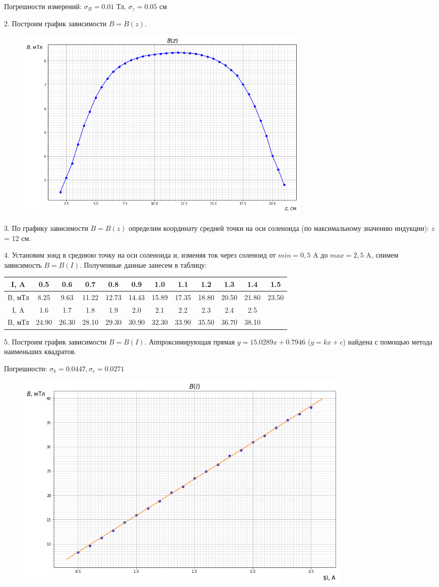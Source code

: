 \documentclass[a4paper]{article}
\begin{document}
Погрешности измерений: $\sigma_{B} = 0.01$ Тл, $\sigma_{z} = 0.05$ см


	2. Построим график зависимости  $B = B(z)$.
\begin{figure}[H]
\centering
\includegraphics[width=0.7\textwidth]{1_2_ris1.png}
\end{figure}

	3. По графику зависимости $B =B(z)$ определим координату средней точки на оси соленоида (по максимальному значению индукции): $z$ = 12 см.

	4. Установим зонд в среднюю точку на оси соленоида и, изменяя ток через соленоид от $min = 0,5$ A до $max = 2,5$ A, снимем зависимость $B = B(I)$. Полученные данные занесем в таблицу:
    \begin{table}[!htbp]
\centering
	\begin{tabular}{|c|c|c|c|c|c|c|c|c|c|c|c|} \hline
    I, A & 0.5 & 0.6 & 0.7 & 0.8 & 0.9 & 1.0 & 1.1 & 1.2 & 1.3 & 1.4 & 1.5 \\ \hline
    B, мТл & 8.25 & 9.63 & 11.22 & 12.73 & 14.43 & 15.89 & 17.35 & 18.80 & 20.50 & 21.80 & 23.50 \\ \hline
    I, A & 1.6 & 1.7 & 1.8 & 1.9 & 2.0 & 2.1 & 2.2 & 2.3 & 2.4 & 2.5 & \\ \hline
    B, мТл & 24.90 & 26.30 & 28.10 & 29.30 & 30.90 & 32.30 & 33.90 & 35.50 & 36.70 & 38.10 & \\ \hline
	\end{tabular}
\end{table}
    
    
    5. Построим график зависимости $B = B(I)$. Аппроксимирующая прямая $y = 15.0289x + 0.7946$  ($y = kx + c$) найдена с помощью метода наименьших квадратов.
    
    Погрешности: $\sigma_{k} = 0.0447, \sigma_{c} = 0.0271$  
    \begin{figure}[H]
    \centering
	\includegraphics[width=0.8\textwidth]{1_2_ris2.png}
	\end{figure}
	
\end{document}
